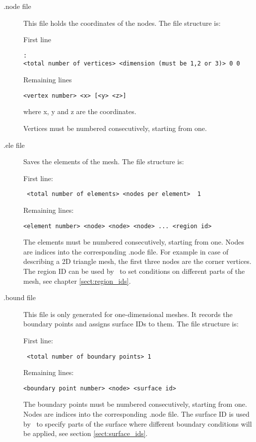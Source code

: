 \begin{description}
\item[.node file]
This file holds the coordinates of the nodes. The file structure is:

First line
\begin{lstlisting}: 
<total number of vertices> <dimension (must be 1,2 or 3)> 0 0
\end{lstlisting}
Remaining lines
\begin{lstlisting}
<vertex number> <x> [<y> <z>]
\end{lstlisting} 
where x, y and z are the coordinates.

Vertices must be numbered consecutively, starting from one. 

\item[.ele file] Saves the elements of the mesh. The file structure is:

First line:
\begin{lstlisting}
 <total number of elements> <nodes per element>  1
\end{lstlisting}
Remaining lines:
\begin{lstlisting} 
<element number> <node> <node> <node> ... <region id>
\end{lstlisting}  
The elements must be numbered consecutively, starting from one. Nodes are
indices into the corresponding .node file. For example in case of describing
a 2D triangle mesh, the first three nodes are the corner vertices. The
region ID can be used by \fluidity\ to set conditions on different parts of
the mesh, see chapter \ref{sect:region_ids}.

\item[.bound file] This file is only generated for one-dimensional meshes.
  It records the boundary points and assigns surface IDs to them. The file
  structure is:

First line:
\begin{lstlisting}
 <total number of boundary points> 1
\end{lstlisting}
Remaining lines:
\begin{lstlisting} 
<boundary point number> <node> <surface id>
\end{lstlisting}  
The boundary points must be numbered consecutively, starting from one. Nodes
are indices into the corresponding .node file. The surface ID is used by
\fluidity\ to specify parts of the surface where different boundary
conditions will be applied, see section \ref{sect:surface_ids}.


\end{description}
